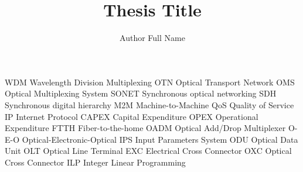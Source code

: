 \title{Thesis Title}
\author{Author Full Name}

\setcounter{tocdepth}{2}

\makenoidxglossaries


           {WDM}
           {Wavelength Division Multiplexing}
           {OTN}
           {Optical Transport Network}
           {OMS}
           {Optical Multiplexing System}
           {SONET}
           {Synchronous optical networking}
           {SDH}
           {Synchronous digital hierarchy}
           {M2M}
           {Machine-to-Machine}
           {QoS}
           {Quality of Service}
           {IP}
           {Internet Protocol}
           {CAPEX}
           {Capital Expenditure}
           {OPEX}
           {Operational Expenditure}
           {FTTH}
           {Fiber-to-the-home}
           {OADM}
           {Optical Add/Drop Multiplexer}
           {O-E-O}
           {Optical-Electronic-Optical}
           {IPS}
           {Input Parameters System}
           {ODU}
           {Optical Data Unit}
           {OLT}
           {Optical Line Terminal}
           {EXC}
           {Electrical Cross Connector}
           {OXC}
           {Optical Cross Connector}
           {ILP}
           {Integer Linear Programming}
           
           

\DeclareMathOperator{\myScore}{score}

